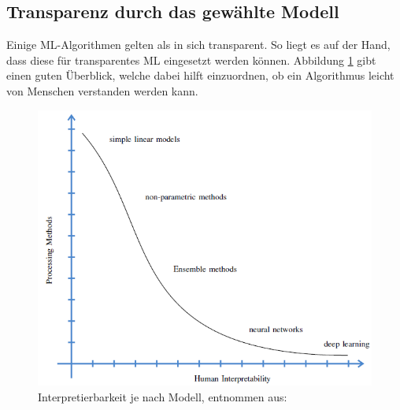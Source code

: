 \subsection{Transparenz durch das gewählte Modell}
Einige ML-Algorithmen gelten als in sich transparent. So liegt es auf der Hand, dass diese für transparentes ML eingesetzt werden können. 
Abbildung \ref{Fig:interpretierbarkeitJeModell} gibt einen guten Überblick, welche dabei hilft einzuordnen, ob ein Algorithmus leicht von Menschen verstanden werden kann.
\begin{figure}
    \centering
    \includegraphics[scale=0.55]{pic/MA-Bilder/Literaturrecherche/48-InterpretierbarkeitJeModell.PNG}
    \caption{Interpretierbarkeit je nach Modell, entnommen aus: \cite{vorm2018assessing}}
    \label{Fig:interpretierbarkeitJeModell}
\end{figure}

